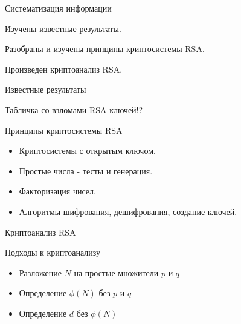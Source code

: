 
\begin{frame}{Систематизация информации}
	\begin{block}{1}
		Изучены известные результаты.
	\end{block}

	\begin{block}{2}
		Разобраны и изучены принципы криптосистемы RSA.
	\end{block}

	\begin{block}{3}
		Произведен криптоанализ RSA.
	\end{block}
\end{frame}

\begin{frame}{Известные результаты}
	\begin{center}
		Табличка со взломами RSA ключей!?	 
	\end{center}
\end{frame}

\begin{frame}{Принципы криптосистемы RSA}
	\begin{center}
		\begin{itemize}
			\item Криптосистемы с открытым ключом.
	        \item Простые числа - тесты и генерация.
	        \item Факторизация чисел.
	        \item Алгоритмы шифрования, дешифрования, создание ключей.
    	\end{itemize}
	\end{center}
\end{frame}

\begin{frame}{Криптоанализ RSA}
	\begin{center}

		\begin{block}{Подходы к криптоанализу}
			\begin{itemize}
		        \item Разложение $N$ на простые множители $p$ и $q$
		        \item Определение $\phi(N)$ без $p$ и $q$
		        \item Определение $d$ без $\phi(N)$
    		\end{itemize}
		\end{block}	 		 
    
	\end{center}
\end{frame}

